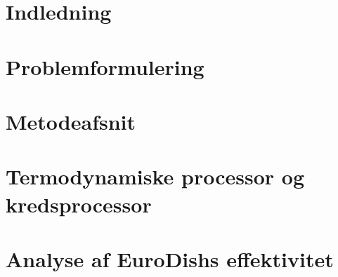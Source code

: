 \documentclass[12pt,a4paper]{article}
\author{Christian Kaae Larsen}
\begin{document}
	\tableofcontents
	
	\section{Indledning}
	
	
	\section{Problemformulering}
	
	
	\section{Metodeafsnit} %
	
	
	\section{Termodynamiske processor og kredsprocessor}
	
	
	\section{Analyse af EuroDishs effektivitet}
	
		
		
			
			
			
			
			
			
\end{document}

